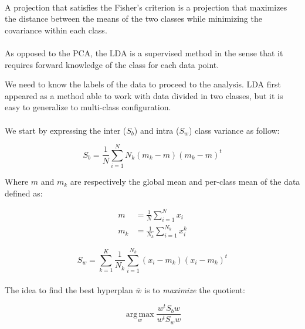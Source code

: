 \documentclass[a4paper]{article}
\begin{document}
\paragraph{}

A projection that satisfies the Fisher's criterion is a projection that maximizes the distance between the means of the two classes while minimizing the covariance within each class.

\paragraph{}

As opposed to the PCA, the LDA is a supervised method in the sense that it requires forward knowledge of the class for each data point.

We need to know the labels of the data to proceed to the analysis. LDA first appeared as a method able to work with data divided in two classes, but it is easy to generalize to multi-class configuration.

\paragraph{}
We start by expressing the inter ($S_b$) and intra ($S_w$) class variance as follow:

\begin{equation*}
S_b = \frac{1}{N}\sum_{i = 1}^N N_k(m_k - m)(m_k - m)^t
\end{equation*}

Where $m$ and $m_k$ are respectively the global mean and per-class mean of the data defined as:

\begin{align*}
m &= \frac{1}{N}\sum_{i = 1}^{N} x_i \\
m_k &= \frac{1}{N_k}\sum_{i = 1}^{N_k} x_i^k
\end{align*}

\begin{equation*}
S_w = \sum_{k = 1}^{K}\frac{1}{N_k}\sum_{i = 1}^{N_k} (x_i - m_k)(x_i - m_k)^t
\end{equation*}

\paragraph{}
The idea to find the best hyperplan $\bar{w}$ is to \emph{maximize} the quotient:

\begin{equation*}
\boxed{\operatorname*{arg\,max}_w \frac{w^tS_bw}{w^tS_ww}}
\end{equation*}
\end{document}
